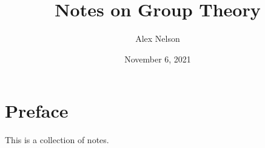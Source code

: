 \documentclass[oneside]{book}
\title{Notes on Group Theory}
\author{Alex Nelson}
\date{November 6, 2021}
\begin{document}
\frontmatter
\maketitle\setcounter{page}{2}

\chapter{Preface}

This is a collection of notes.

\tableofcontents

\mainmatter
\setcounter{chapter}{-1}

\end{document}
